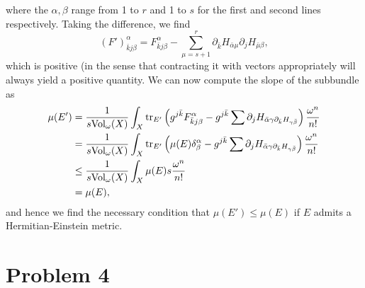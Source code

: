 \documentclass{../mathnotes}
\begin{document}
\begin{enumerate}[(a)]
        where the $\alpha,\beta$ range from 1 to $r$ and 1 to $s$ for the first and second lines respectively.
        Taking the difference, we find
        \[(F')_{\bar kj\beta}^\alpha=F_{\bar kj\beta}^\alpha-\sum_{\mu=s+1}^r\partial_{\bar k}H_{\bar\alpha\mu}\partial_jH_{\bar\mu\beta},\]
        which is positive (in the sense that contracting it with vectors appropriately will always yield a positive quantity.
        We can now compute the slope of the subbundle as
        \begin{align*}
            \mu(E') &= \frac{1}{s\text{Vol}_\omega(X)}\int_X \operatorname{tr}_{E'}\left( g^{j\bar k}F_{\bar kj\beta}^\alpha-g^{j\bar k}\sum\partial_jH_{\bar\alpha\gamma\partial_{\bar k}H_{\gamma\bar\beta}} \right)\frac{\omega^n}{n!}\\
            &= \frac{1}{s\text{Vol}_\omega(X)}\int_X \operatorname{tr}_{E'}\left( \mu(E)\delta^\alpha_\beta-g^{j\bar k}\sum\partial_jH_{\bar\alpha\gamma\partial_{\bar k}H_{\gamma\bar\beta}} \right)\frac{\omega^n}{n!}\\
            &\leq \frac{1}{s\text{Vol}_\omega(X)}\int_X\mu(E)s\frac{\omega^n}{n!}\\
            &=\mu(E),
        \end{align*}
        and hence we find the necessary condition that $\mu(E')\leq\mu(E)$ if $E$ admits a Hermitian-Einstein metric.
\end{enumerate}

\section*{Problem 4}
\end{document}
